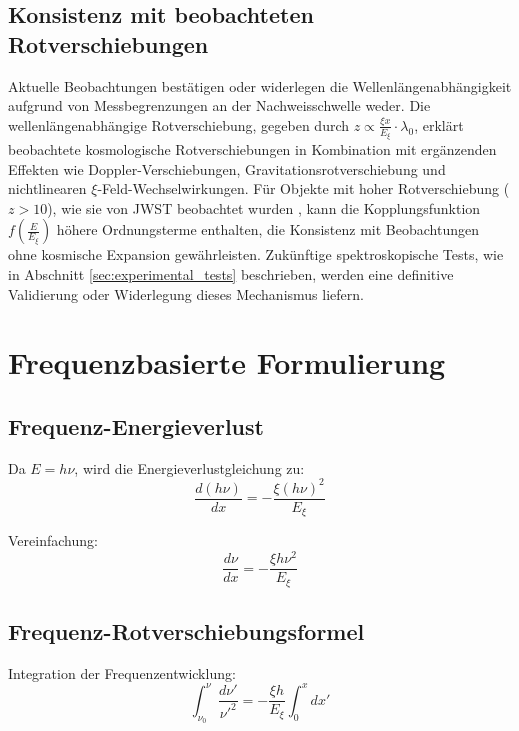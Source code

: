 \documentclass[12pt,a4paper]{article}
\newcommand{\Exi}{E_\xi}
\newcommand{\lambdazero}{\lambda_0}
\newcommand{\nuzero}{\nu_0}
\theoremstyle{definition}
\begin{document}
	\subsection{Konsistenz mit beobachteten Rotverschiebungen}
	Aktuelle Beobachtungen best\"atigen oder widerlegen die Wellenl\"angenabh\"angigkeit aufgrund von Messbegrenzungen an der Nachweisschwelle weder. Die wellenl\"angenabh\"angige Rotverschiebung, gegeben durch $z \propto \frac{\xi x}{\Exi} \cdot \lambdazero$, erkl\"art beobachtete kosmologische Rotverschiebungen in Kombination mit erg\"anzenden Effekten wie Doppler-Verschiebungen, Gravitationsrotverschiebung und nichtlinearen $\xi$-Feld-Wechselwirkungen. F\"ur Objekte mit hoher Rotverschiebung ($z > 10$), wie sie von JWST beobachtet wurden \cite{jwst_early}, kann die Kopplungsfunktion $f\left(\frac{E}{\Exi}\right)$ h\"ohere Ordnungsterme enthalten, die Konsistenz mit Beobachtungen ohne kosmische Expansion gew\"ahrleisten. Zuk\"unftige spektroskopische Tests, wie in Abschnitt \ref{sec:experimental_tests} beschrieben, werden eine definitive Validierung oder Widerlegung dieses Mechanismus liefern.
	
	\section{Frequenzbasierte Formulierung}
	
	\subsection{Frequenz-Energieverlust}
	
	Da $E = h\nu$, wird die Energieverlustgleichung zu:
	\begin{equation}
		\frac{d(h\nu)}{dx} = -\frac{\xi (h\nu)^2}{\Exi}
	\end{equation}
	
	Vereinfachung:
	\begin{equation}
		\frac{d\nu}{dx} = -\frac{\xi h \nu^2}{\Exi}
	\end{equation}
	
	\subsection{Frequenz-Rotverschiebungsformel}
	
	Integration der Frequenzentwicklung:
	\begin{equation}
		\int_{\nuzero}^{\nu} \frac{d\nu'}{\nu'^2} = -\frac{\xi h}{\Exi} \int_0^x dx'
	\end{equation}
	
\end{document}
